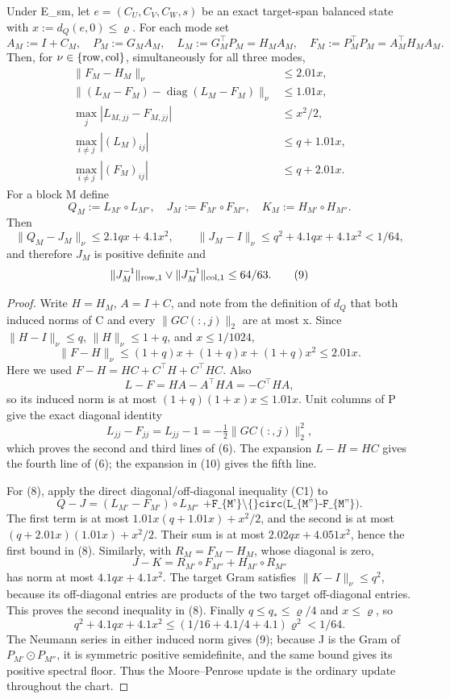 \begin{lemma}\label{lem:step-011-gram-reserve}
Under E\_sm, let
\(e=(C_U,C_V,C_W,s)\) be an exact target-span balanced state with
\(x:=d_Q(e,0)\le\varrho\). For each mode set
\[
 A_M:=I+C_M,\quad P_M:=G_MA_M,\quad
 L_M:=G_M^\top P_M=H_MA_M,\quad
 F_M:=P_M^\top P_M=A_M^\top H_MA_M.
\tag{5}
\]
Then, for \(\nu\in\{{\rm row},{\rm col}\}\), simultaneously for all
three modes,
\[
\begin{aligned}
 \|F_M-H_M\|_\nu&\le2.01x,\\
 \|(L_M-F_M)-\operatorname{diag}(L_M-F_M)\|_\nu&\le1.01x,\\
 \max_j|L_{M,jj}-F_{M,jj}|&\le x^2/2,\\
 \max_{i\ne j}|(L_M)_{ij}|&\le q+1.01x,\\
 \max_{i\ne j}|(F_M)_{ij}|&\le q+2.01x.
\end{aligned}
\tag{6}
\]
For a block M define
\[
 Q_M:=L_{M'}\circ L_{M''},\quad
 J_M:=F_{M'}\circ F_{M''},\quad
 K_M:=H_{M'}\circ H_{M''}.
\tag{7}
\]
Then
\[
 \|Q_M-J_M\|_\nu\le2.1qx+4.1x^2,
 \qquad
 \|J_M-I\|_\nu\le q^2+4.1qx+4.1x^2<1/64,
\tag{8}
\]
and therefore \(J_M\) is positive definite and
\[
 \|J_M^{-1}\|_{\rm row,1}\vee\|J_M^{-1}\|_{\rm col,1}\le64/63.
\tag{9}
\]

\begin{proof}
Write \(H=H_M\), \(A=I+C\), and note from
the definition of \(d_Q\) that both induced norms of C and every
\(\|GC(:,j)\|_2\) are at most x. Since \(\|H-I\|_\nu\le q\),
\(\|H\|_\nu\le1+q\), and \(x\le1/1024\),
\[
 \|F-H\|_\nu
 \le (1+q)x+(1+q)x+(1+q)x^2\le2.01x.
\tag{10}
\]
Here we used \(F-H=HC+C^\top H+C^\top HC\). Also
\[
 L-F=HA-A^\top HA=-C^\top HA,
\tag{11}
\]
so its induced norm is at most \((1+q)(1+x)x\le1.01x\).
Unit columns of P give the exact diagonal identity
\[
 L_{jj}-F_{jj}=L_{jj}-1=-\tfrac12\|GC(:,j)\|_2^2,
\tag{12}
\]
which proves the second and third lines of (6). The expansion
\(L-H=HC\) gives the fourth line of (6); the expansion in (10) gives the
fifth line.

For (8), apply the direct diagonal/off-diagonal inequality (C1) to
\[
 Q-J=(L_{M'}-F_{M'})\circ L_{M''}
\texttt{   +F\_\{M'\}\textbackslash\{\}circ(L\_\{M''\}-F\_\{M''\}).}
\tag{13}
\]
The first term is at most
\(1.01x(q+1.01x)+x^2/2\), and the second is at most
\((q+2.01x)(1.01x)+x^2/2\). Their sum is at most
\(2.02qx+4.051x^2\), hence the first bound in (8). Similarly, with
\(R_M=F_M-H_M\), whose diagonal is zero,
\[
 J-K=R_{M'}\circ F_{M''}+H_{M'}\circ R_{M''}
\tag{14}
\]
has norm at most \(4.1qx+4.1x^2\). The target Gram satisfies
\(\|K-I\|_\nu\le q^2\), because its off-diagonal entries are products of
the two target off-diagonal entries. This proves the second inequality in
(8). Finally \(q\le q_*\le\varrho/4\) and \(x\le\varrho\), so
\[
q^2+4.1qx+4.1x^2
\le(1/16+4.1/4+4.1)\varrho^2<1/64.
\tag{15}
\]
The Neumann series in either induced norm gives (9); because J is the Gram
of \(P_{M'}\odot P_{M''}\), it is symmetric positive semidefinite, and
the same bound gives its positive spectral floor. Thus the Moore--Penrose
update is the ordinary update throughout the chart.


\end{proof}
\end{lemma}

